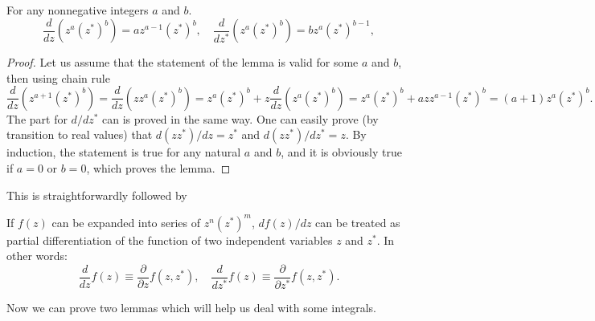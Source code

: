 \begin{lemma}
For any nonnegative integers $a$ and $b$.
\[
	\frac{d}{dz} (z^a (z^*)^b) = a z^{a-1} (z^*)^b,
	\quad
	\frac{d}{dz^*} (z^a (z^*)^b) = b z^a (z^*)^{b-1},
\]
\end{lemma}
\begin{proof}
Let us assume that the statement of the lemma is valid for some $a$ and $b$, then using chain rule
\[
	\frac{d}{dz} (z^{a+1} (z^*)^b)
	= \frac{d}{dz} (z z^a (z^*)^b)
	= z^a (z^*)^b + z \frac{d}{dz} (z^a (z^*)^b)
	= z^a (z^*)^b + a z z^{a-1} (z^*)^b
	= (a + 1) z^a (z^*)^b.
\]
The part for $d/dz^*$ can is proved in the same way.
One can easily prove (by transition to real values) that $d(z z^*)/dz = z^*$ and $d(z z^*)/dz^* = z$.
By induction, the statement is true for any natural $a$ and $b$,
and it is obviously true if $a = 0$ or $b = 0$, which proves the lemma.
\end{proof}

This is straightforwardly followed by
\begin{lemma}
\label{lmm:formalism:c-numbers:independent-vars}
If $f(z)$ can be expanded into series of $z^n (z^*)^m$, $df(z)/dz$ can be treated as partial differentiation of the function of two independent variables $z$ and $z^*$.
In other words:
\[
	\frac{d}{dz} f(z) \equiv \frac{\partial}{\partial z} f(z, z^*),
	\quad
	\frac{d}{dz^*} f(z) \equiv \frac{\partial}{\partial z^*} f(z, z^*).
\]
\end{lemma}

Now we can prove two lemmas which will help us deal with some integrals.

